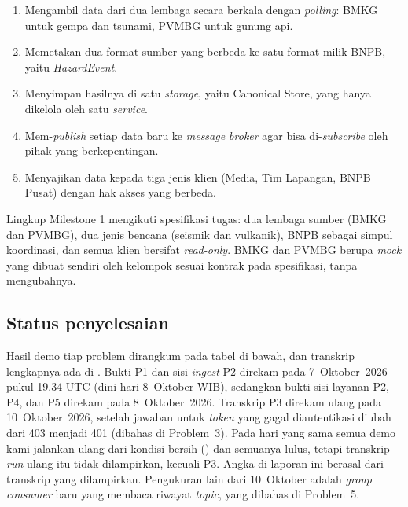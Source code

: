\begin{enumerate}
 \item Mengambil data dari dua lembaga secara berkala dengan \emph{polling}: BMKG untuk gempa dan tsunami, PVMBG untuk gunung api.
 \item Memetakan dua format sumber yang berbeda ke satu format milik BNPB, yaitu \emph{HazardEvent}.
 \item Menyimpan hasilnya di satu \emph{storage}, yaitu Canonical Store, yang hanya dikelola oleh satu \emph{service}.
 \item Mem-\emph{publish} setiap data baru ke \emph{message broker} agar bisa di-\emph{subscribe} oleh pihak yang berkepentingan.
 \item Menyajikan data kepada tiga jenis klien (Media, Tim Lapangan, BNPB Pusat) dengan hak akses yang berbeda.
\end{enumerate}

Lingkup Milestone 1 mengikuti spesifikasi tugas: dua lembaga sumber (BMKG dan PVMBG), dua jenis bencana (seismik dan
vulkanik), BNPB sebagai simpul koordinasi, dan semua klien bersifat \emph{read-only}. BMKG dan PVMBG berupa \emph{mock}
yang dibuat sendiri oleh kelompok sesuai kontrak pada spesifikasi, tanpa mengubahnya.

\subsection*{Status penyelesaian}

Hasil demo tiap problem dirangkum pada tabel di bawah, dan transkrip lengkapnya ada di . Bukti P1 dan
sisi \emph{ingest} P2 direkam pada 7~Oktober~2026 pukul 19.34 UTC (dini hari 8~Oktober WIB), sedangkan bukti sisi layanan
P2, P4, dan P5 direkam pada 8~Oktober~2026. Transkrip P3 direkam ulang pada 10~Oktober~2026, setelah jawaban untuk \emph{token}
yang gagal diautentikasi diubah dari 403 menjadi 401 (dibahas di Problem~3). Pada hari yang sama semua demo kami jalankan
ulang dari kondisi bersih () dan semuanya lulus, tetapi transkrip \emph{run} ulang itu tidak dilampirkan,
kecuali P3. Angka di laporan ini berasal dari transkrip yang dilampirkan. Pengukuran lain dari 10~Oktober adalah \emph{group}
\emph{consumer} baru yang membaca riwayat \emph{topic}, yang dibahas di Problem~5.

